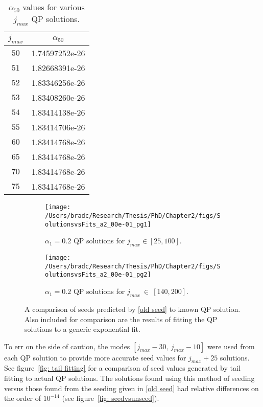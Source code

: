 \documentclass[../PhD.tex]{subfiles}
\begin{document}
\begin{subappendices}
\begin{table}[h]
		\centering
		\begin{tabular}[t]{| c | c |}
			\hline 
			 $j_{max}$ & $\alpha_{50}$  \\ \hline 
			 $50$ & 1.74597252e-26  \\ \hline
			 $51$ & 1.82668391e-26   \\ \hline
			 $52$ & 1.83346256e-26   \\ \hline
			 $53$ & 1.83408260e-26    \\ \hline
			 $54$ & 1.83414138e-26    \\ \hline
			 $55$ & 1.83414706e-26    \\ \hline
			 $60$ & 1.83414768e-26    \\ \hline
			 $65$ & 1.83414768e-26    \\ \hline
			 $70$ & 1.83414768e-26    \\ \hline
			 $75$ & 1.83414768e-26    \\ \hline
		\end{tabular}
		\caption[Convergence of the real coefficient $\alpha_j$ of the $j = 50$ mode with increasing $j_{max}$]{$\alpha_{50}$ values for various $j_{max}$ QP solutions.}
		\label{table: edge effects}
\end{table}

\begin{figure}[ht]
\centering
	\begin{subfigure}[t]{0.45\textwidth}
		\texttt{[image: /Users/bradc/Research/Thesis/PhD/Chapter2/figs/SolutionsvsFits\_a2\_00e-01\_pg1]}
		\caption{$\alpha_1 = 0.2$ QP solutions for $j_{max} \in [25,100]$.}
		\label{fig: sol vs fit low jmax}
	\end{subfigure}
	\quad
	\begin{subfigure}[t]{0.45\textwidth}
		\texttt{[image: /Users/bradc/Research/Thesis/PhD/Chapter2/figs/SolutionsvsFits\_a2\_00e-01\_pg2]}
		\caption{$\alpha_1 = 0.2$ QP solutions for $j_{max}~\in~[140,200]$.}
		\label{fig: sol vs fit high jmax}
	\end{subfigure}
	\caption[Comparison of seed values to known QP solutions and exponential fitting]{A comparison of seeds predicted by \eqref{old seed} to known QP solution. Also included for comparison are the results of fitting the QP solutions to a generic exponential fit.}
	\label{fig: solutionfitting}
\end{figure}
			

To err on the side of caution, the modes $[ j_{max} - 30,\: j_{max} - 10]$ were used from each QP solution to provide more accurate seed values for $j_{max} + 25$ solutions. See figure~\ref{fig: tail fitting} for a comparison of seed values generated by tail fitting to actual QP solutions. The solutions found using this method of seeding versus those found from the seeding given in \eqref{old seed} had relative differences on the order of $10^{-14}$ (see figure~\ref{fig: seedvsunseed}).


\end{subappendices}
\end{document}
